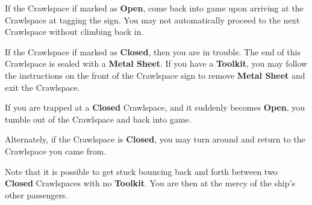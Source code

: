 \documentclass[green]{airship}
\begin{document}
\begin{enum}
  \item If the Crawlspace if marked as {\bf Open}, come back into game upon arriving at the Crawlspace at tagging the sign. You may not automatically proceed to the next Crawlspace without climbing back in.
  \item If the Crawlspace if marked as {\bf Closed}, then you are in trouble. The end of this Crawlspace is sealed with a {\bf Metal Sheet}. If you have a {\bf Toolkit}, you may follow the instructions on the front of the Crawlspace sign to remove {\bf Metal Sheet} and exit the Crawlspace. 
  \item If you are trapped at a {\bf Closed} Crawlspace, and it suddenly becomes {\bf Open}, you tumble out of the Crawlspace and back into game.
  \item Alternately, if the Crawlspace is {\bf Closed}, you may turn around and return to the Crawlspace you came from.
  \item Note that it is possible to get stuck bouncing back and forth between two {\bf Closed} Crawlspaces with no {\bf Toolkit}. You are then at the mercy of the ship's other passengers.
\end{enum}
\end{document}
